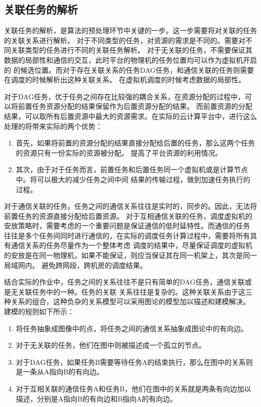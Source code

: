 \subsection{关联任务的解析}
关联任务的解析，是算法的预处理环节中关键的一步。这一步需要将对关联的任务的关联关系进行解析。
对于不同类型的任务，对资源的需求是不同的。需要对不同关联类型的任务进行不同的关联任务解析。
对于无关联的任务，不需要保证其数据的局部性和通信的交互，此时平台的物理机的任务位置均可以作为虚拟机开启的
的候选位置。而对于存在关联关系的任务DAG任务，和通信关联的任务则需要在调度的时候解析出这种关联关系。
在虚拟机调度的时候考虑数据的局部性。

对于DAG任务，优于任务之间存在比较强的耦合关系，在资源分配的过程中，可以将前置任务资源分配的结果保留作为后置资源分配的结果。
而前置资源的分配结果，可以取所有后置资源中最大的资源需求。在实际的云计算平台中，进行这么处理的将带来实际的两个优势：
\begin{enumerate}
\item 首先，如果将前置的资源分配的结果直接分配给后置的任务，那么这两个任务的资源只有一份实际的资源被分配。
提高了平台资源的利用情况。
\item 其次，由于对于任务而言，前置任务和后置任务同一个虚拟机或是计算节点中。将可以极大的减少任务之间中间
结果的传输过程，做到加速任务执行的过程。
\end{enumerate}

对于通信关联的任务。任务之间的通信关系往往是实时的，同步的。因此，无法将前置任务的资源直接分配给后置资源。
对于互相通信关联的任务，调度虚拟机的安放策略时，需要考虑的一个重要问题是保证通信的低时延特性。而通信的任务
往往是多个任务间同时进行通信的，在实际的调度任务计算过程中，需要将所有具有通信关系的任务尽量作为一个整体考虑
调度的结果中，尽量保证调度的虚拟机的安放是在同一物理机，如果不能保证，则应当保证其在同一机架上，其次是同一局域网内。
避免跨网段，跨机房的调度结果。

结合实际的作业中，任务之间的关系往往不是只有简单的DAG任务，通信关联或是无关联任务中的一种。任务的关联
关系往往是复杂的。这种关联关系由于这三种关系的组合，这种负杂的关系模型可以采用图论的模型加以描述和建模解决。
建模的规则如下所示：
\begin{enumerate}
\item 将任务抽象成图像中的点，将任务之间的通信关系抽象成图论中的有向边。
\item 对于无关联的任务，他们在图中则被描述成一个孤立的节点。
\item 对于DAG任务，如果任务B需要等待任务A的结束执行，那么在图中的关系则是一条从A指向B的有向边。
\item 对于互相关联的通信任务A和任务B，他们在图中的关系就是两条有向边加以描述，分别是A指向B的有向边和B指向A的有向边。
\end{enumerate}

